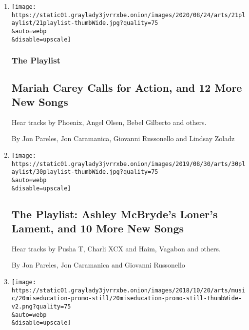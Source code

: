 \begin{enumerate}
\def\labelenumi{\arabic{enumi}.}
\item
  \href{/2020/08/21/arts/music/playlist-mariah-carey-bts-phoenix.html}{}

  \texttt{[image: https://static01.graylady3jvrrxbe.onion/images/2020/08/24/arts/21playlist/21playlist-thumbWide.jpg?quality=75\\\&auto=webp\\\&disable=upscale]}

  \hypertarget{the-playlist}{%
  \subsubsection{The Playlist}\label{the-playlist}}

  \hypertarget{mariah-carey-calls-for-action-and-12-more-new-songs}{%
  \subsection{Mariah Carey Calls for Action, and 12 More New
  Songs}\label{mariah-carey-calls-for-action-and-12-more-new-songs}}

  Hear tracks by Phoenix, Angel Olsen, Bebel Gilberto and others.

  By Jon Pareles, Jon Caramanica, Giovanni Russonello and Lindsay Zoladz
\item
  \href{/2019/08/30/arts/music/playlist-pusha-t-asap-rocky-charli-xcx.html}{}

  \texttt{[image: https://static01.graylady3jvrrxbe.onion/images/2019/08/30/arts/30playlist/30playlist-thumbWide.jpg?quality=75\\\&auto=webp\\\&disable=upscale]}

  \hypertarget{the-playlist-ashley-mcbrydes-loners-lament-and-10-more-new-songs}{%
  \subsection{The Playlist: Ashley McBryde's Loner's Lament, and 10 More
  New
  Songs}\label{the-playlist-ashley-mcbrydes-loners-lament-and-10-more-new-songs}}

  Hear tracks by Pusha T, Charli XCX and Haim, Vagabon and others.

  By Jon Pareles, Jon Caramanica and Giovanni Russonello
\item
  \href{/interactive/2018/10/19/arts/music/miseducation-lauryn-hill-kids.html}{}

  \texttt{[image: https://static01.graylady3jvrrxbe.onion/images/2018/10/20/arts/music/20miseducation-promo-still/20miseducation-promo-still-thumbWide-v2.png?quality=75\\\&auto=webp\\\&disable=upscale]}


\end{enumerate}
